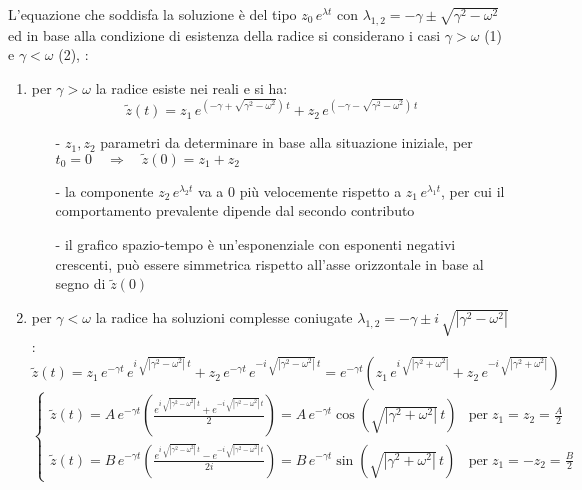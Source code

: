 \documentclass[a4paper]{article}
\begin{document}
L'equazione che soddisfa la soluzione è del tipo \(z_0 \, e^{\lambda t}\) con \(\lambda_{1,2} = -\gamma \pm \sqrt{\gamma^2-\omega^2}\) ed
in base alla condizione di esistenza della radice si considerano i casi \(\gamma > \omega\) (1) e \(\gamma < \omega\) (2), :
\begin{enumerate}
	\item per \(\gamma > \omega\) la radice esiste nei reali e si ha:
	\[\tilde{z}(t) = z_1 \, e^{\left(-\gamma + \sqrt{\gamma^2 - \omega^2}\right) \, t} + z_2 \,  e^{\left(-\gamma - \sqrt{\gamma^2 - \omega^2}\right) \, t}\]
	\begin{itemize}[topsep=3pt, itemsep=0pt]
		\item[-] \(z_1, z_2\) parametri da determinare in base alla situazione iniziale, per \(t_0 = 0 \quad \Rightarrow \quad \tilde{z}(0) = z_1 + z_2\)
		\item[-] la componente \(z_2 \, e^{\lambda_2 t}\) va a 0 più velocemente rispetto a \(z_1 \, e^{\lambda_1 t}\), per cui
		il comportamento prevalente dipende dal secondo contributo
		\item[-] il grafico spazio-tempo è un'esponenziale con esponenti negativi crescenti, può essere simmetrica rispetto
		all'asse orizzontale in base al segno di \(\tilde{z}(0)\)
	\end{itemize}
	\item per \(\gamma < \omega\) la radice ha soluzioni complesse coniugate \(\lambda_{1,2} = -\gamma \pm i \, \sqrt{\left|\gamma^2 - \omega^2\right|}\):
	\setcounter{equation}{0}
	\begin{equation}
		\label{eq1}
		\tilde{z}(t) = z_1 \, e^{-\gamma t} \, e^{i \, \sqrt{\left|\gamma^2 - \omega^2\right|} \, t} + z_2 \, e^{-\gamma t} \, e^{-i \, \sqrt{\left|\gamma^2 - \omega^2\right|} \, t} =
		e^{-\gamma t} \left(z_1 \, e^{i \, \sqrt{\left|\gamma^2 + \omega^2\right|}} + z_2 \, e^{-i \, \sqrt{\left|\gamma^2 + \omega^2\right|}}\right)
	\end{equation}
	\begin{equation}
		\label{eq2}
		\begin{cases}
			\tilde{z}(t) = A \, e^{-\gamma t} \left( \frac{e^{i \, \sqrt{\left|\gamma^2 - \omega^2\right|} \, t} + e^{-i \, \sqrt{\left|\gamma^2 - \omega^2\right|} \, t}}{2}\right) = A \, e^{-\gamma t} \cos \left(\sqrt{\left|\gamma^2 + \omega^2\right|} \, t\right) &\text{per} \; z_1 = z_2 = \frac{A}{2} \\
			\tilde{z}(t) = B \, e^{-\gamma t} \left( \frac{e^{i \, \sqrt{\left|\gamma^2 - \omega^2\right|} \, t} - e^{-i \, \sqrt{\left|\gamma^2 - \omega^2\right|} \, t}}{2i}\right) = B \, e^{-\gamma t} \sin \left(\sqrt{\left|\gamma^2 + \omega^2\right|} \, t\right) &\text{per} \; z_1 = - z_2 = \frac{B}{2}

\end{cases}
\end{equation}
\end{enumerate}
\end{document}
